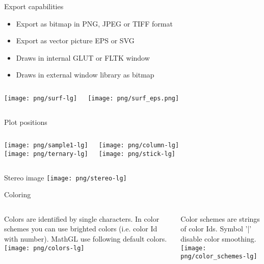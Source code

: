 \documentclass[color=usenames]{beamer}
\begin{document}
\begin{frame}{Export capabilities}
\begin{itemize}
\item Export as bitmap in PNG, JPEG or TIFF format
\item Export as vector picture EPS or SVG
\item Draws in internal GLUT or FLTK window
\item Draws in external window library as bitmap
\end{itemize}
\begin{columns}
\texttt{[image: png/surf-lg]}

\texttt{[image: png/surf\_eps.png]}
\end{columns}
\end{frame}


\begin{frame}{Plot positions}
\begin{columns}
\texttt{[image: png/sample1-lg]}\\
\texttt{[image: png/ternary-lg]}

\texttt{[image: png/column-lg]}\\
\texttt{[image: png/stick-lg]}

\end{columns}
\end{frame}

\begin{frame}{Stereo image}
\texttt{[image: png/stereo-lg]}
\end{frame}


\begin{frame}{Coloring}
\begin{columns}
Colors are identified by single characters. In color schemes you can use brighted colors (i.e. color Id with number). MathGL use following default colors.\\
\texttt{[image: png/colors-lg]}

Color schemes are strings of color Ids. Symbol '|' disable color smoothing.\\
\texttt{[image: png/color\_schemes-lg]}
\end{columns}
\end{frame}
\end{document}
